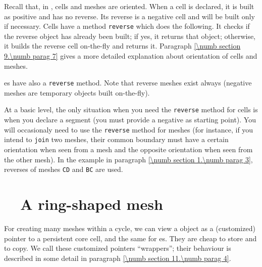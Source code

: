 Recall that, in \maniFEM, cells and meshes are oriented.
When a cell is declared, it is built as positive and has no reverse.
Its reverse is a negative cell and will be built only if necessary.
Cells have a method {\small\tt reverse} which does the following.
It checks if the reverse object has already been built; if yes, it returns that object;
otherwise, it builds the reverse cell on-the-fly and returns it.
Paragraph \ref{\numb section 9.\numb parag 7} gives a more detailed explanation about
orientation of cells and meshes.

{\small\tt {}}es have also a {\small\tt reverse} method.
Note that reverse meshes exist always (negative meshes are temporary objects built
on-the-fly).

At a basic level, the only situation when you need the {\small\tt reverse} method  for cells is
when you declare a segment {\small\tt {}} (you must provide a negative {\small\tt {}} as
starting point).
You will occasionaly need to use the {\small\tt reverse} method for meshes (for instance, if you
intend to {\small\tt join} two meshes, their common boundary must have a certain orientation when
seen from a mesh and the opposite orientation when seen from the other mesh).
In the example in paragraph \ref{\numb section 1.\numb parag 3},
reverses of meshes {\small\tt CD} and {\small\tt BC} are used.


\section{~~A ring-shaped mesh}\label{\numb section 9.\numb parag 2}

For creating many meshes within a cycle, we can view a {\small\tt {}} object as a
(customized) pointer to a persistent core cell, and the same for {\small\tt {}}es.
They are cheap to store and to copy.
We call these customized pointers ``wrappers''; their behaviour is described in some detail in
paragraph \ref{\numb section 11.\numb parag 4}.

